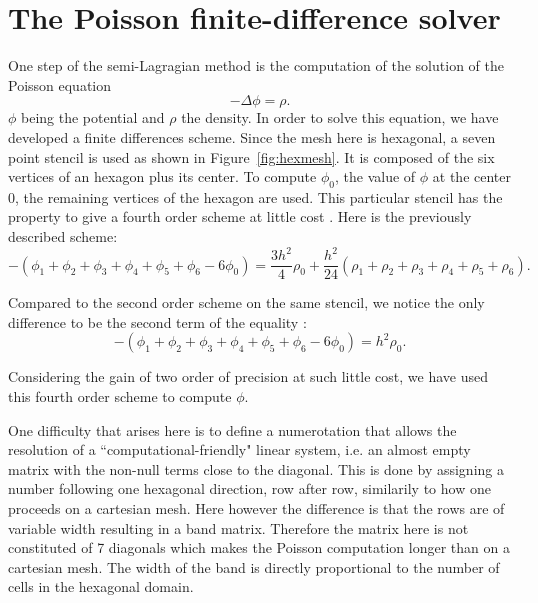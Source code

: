 \documentclass[proc]{edpsmath}
\begin{document}
\section{The Poisson finite-difference solver}
\label{sec:poisson_eqn}


One step of the semi-Lagragian method is the computation of the solution of the Poisson equation
\begin{equation*}
	- \Delta \phi = \rho .
\end{equation*}
 $\phi$ being the potential and $\rho$ the density.
 In order to solve this equation, we have developed a finite differences scheme. Since the mesh here is hexagonal, a seven point stencil is used as shown in Figure~\ref{fig:hexmesh}. It is composed of the six vertices of an hexagon plus its center. To compute  $\phi_0$, the value of $\phi$ at the center $0$,  the remaining vertices of the hexagon are used. 
 This particular stencil has the property to give a fourth order scheme at little cost \cite{poisson}. Here is the previously described scheme:
\begin{equation*}
-(\phi_1 + \phi_2 + \phi_3 + \phi_4 +\phi_5 + \phi_6 - 6 \phi_0)  = \frac{3h^2}{4} \rho_0 + \frac{h^2}{24}(\rho_1+\rho_2+\rho_3+\rho_4+\rho_5+\rho_6).
\end{equation*} 

Compared to the second order scheme on the same stencil, we notice the only difference to be the second term of the equality :  
\begin{equation*}
-(\phi_1 + \phi_2 + \phi_3 + \phi_4 +\phi_5 + \phi_6 - 6 \phi_0)  = h^2 \rho_0.
\end{equation*} 

Considering the gain of two order of precision at such little cost, we have used this fourth order scheme to compute $\phi$.

 \rmrk One difficulty that arises here is to define a numerotation that allows the resolution of a ``computational-friendly" linear system, i.e. an almost empty matrix with the non-null terms close to the diagonal. This is done by assigning a number following one hexagonal direction, row after row, similarily to how one proceeds on a cartesian mesh. Here however the difference is that the rows are of variable width resulting in a band matrix. Therefore the matrix here is not constituted of 7 diagonals which makes the Poisson computation longer than on a cartesian mesh. The width of the band is directly proportional to the number of cells in the hexagonal domain.  
\end{document}
